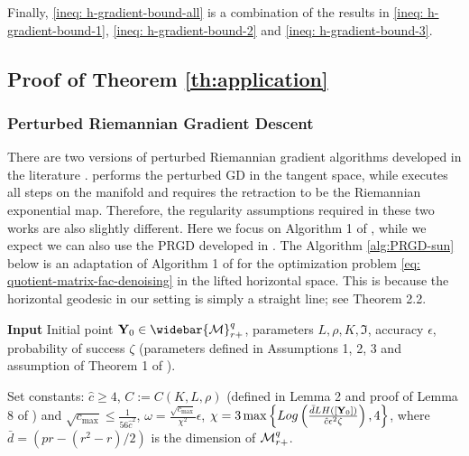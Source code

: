 \documentclass[11pt]{article}
\newcommand{\0}{{\mathbf{0}}}
\newcommand{\1}{{\mathbf{1}}}
\newcommand{\Y}{{\mathbf{Y}}}
\newcommand{\cM}{{\cal M}}
\renewcommand{\log}{{\rm Log}}
\begin{document}
Finally, \eqref{ineq: h-gradient-bound-all} is a combination of the results in \eqref{ineq: h-gradient-bound-1}, \eqref{ineq: h-gradient-bound-2} and \eqref{ineq: h-gradient-bound-3}.




{
\subsection{Proof of Theorem \ref{th:application} } 
\label{app:DegeneracyIterates}



\subsubsection{Perturbed Riemannian Gradient Descent} \label{sec:PRGD}
There are two versions of perturbed Riemannian gradient algorithms developed in the literature \cite{criscitiello2019efficiently,sun2019escaping}. \cite{criscitiello2019efficiently} performs the perturbed GD in the tangent space, while \cite{sun2019escaping} executes all steps on the manifold and requires the retraction to be the Riemannian exponential map. Therefore, the regularity assumptions required in these two works are also slightly different. Here we focus on Algorithm 1 of \cite{sun2019escaping}, while we expect we can also use the PRGD developed in \cite{criscitiello2019efficiently}. The Algorithm \ref{alg:PRGD-sun} below is an adaptation of Algorithm 1 of \cite{sun2019escaping} for the optimization problem \eqref{eq: quotient-matrix-fac-denoising} in the lifted horizontal space. This is because the horizontal geodesic in our setting is simply a straight line; see \cite{massart2020quotient} Theorem 2.2. 
\begin{algorithm}
\caption{Perturbed Riemannian gradient algorithm $(\Y_0,L, \rho, K, \mathfrak{I}, \epsilon, \zeta)$}
{\noindent \bf Input} Initial point $\Y_0 \in \widebar{\cM}_{r+}^{q}$, parameters $L, \rho, K, \mathfrak{I}$, accuracy $\epsilon$, probability of success $\zeta$ (parameters defined in Assumptions 1, 2, 3 and assumption of Theorem 1 of \cite{sun2019escaping}).
\begin{algorithmic}[1]
\State Set constants: $\hat{c} \ge 4$, $C := C(K, L, \rho)$ (defined in Lemma 2 and proof of Lemma 8 of \cite{sun2019escaping})
\Statex \hspace{1em} and $\sqrt{c_{\max}} \leq \frac{1}{56\hat{c}^2}$, $\omega = \frac{\sqrt{c_{\max}}}{\chi^2}\epsilon$, $\chi = 3\max\left\{\log\left(\frac{\bar{d}L H([\Y_0])}{\hat{c}\epsilon^2\zeta}\right), 4\right\}$, where $\bar{d} = (pr - (r^2 -r)/2)$ is the dimension of $\cM^q_{r+}$.

\end{algorithmic}
\end{algorithm}}
\end{document}
